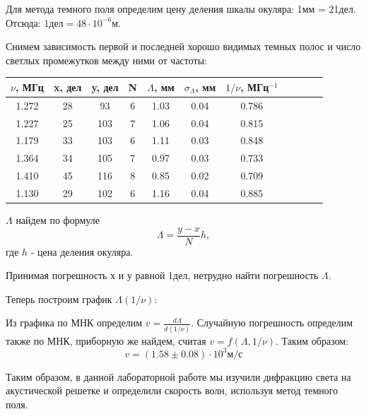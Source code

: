 \documentclass[14pt]{article}
\begin{document}
\vspace{1cm}
Для метода темного поля определим цену деления шкалы окуляра: 1мм = 21дел. Отсюда: $1 \text{дел} = 48\cdot10^{-6}\text{м}$.

Снимем зависимость первой и последней хорошо видимых темных полос и число светлых промежутков между ними от частоты:

\begin{center}
\begin{tabular}{|c|c|c|c|c|c|c|c|c|c|c|}
\hline
$\nu$, МГц	&	x, дел	&	y, дел	&	N	&	$\Lambda$, мм	&	$\sigma_\Lambda$, мм	&	$1/\nu$, МГц$^{-1}$	\\
\hline
1.272		&	28		&	93		&	6	&	1.03			&	0.04					&	0.786				\\
\hline
1.227		&	25		&	103		&	7	&	1.06			&	0.04					&	0.815				\\
\hline
1.179		&	33		&	103		&	6	&	1.11			&	0.03					&	0.848				\\
\hline
1.364		&	34		&	105		&	7	&	0.97			&	0.03					&	0.733				\\
\hline
1.410		&	45		&	116		&	8	&	0.85			&	0.02					&	0.709				\\
\hline
1.130		&	29		&	102		&	6	&	1.16			&	0.04					&	0.885				\\
\hline
\end{tabular}
\end{center}

$\Lambda$ найдем по формуле
$$
	\Lambda = \frac{y-x}{N}h,
$$
\noindent где $h$ - цена деления окуляра.

Принимая погрешность х и у равной 1дел, нетрудно найти погрешность $\Lambda$.

Теперь построим график $\Lambda(1/\nu)$:



Из графика по МНК определим $v = \frac{d\Lambda}{d(1/\nu)}$. Случайную погрешность определим также по МНК, приборную же найдем, считая $v = f(\Lambda, 1/\nu)$. Таким образом:
$$
	v = (1.58 \pm 0.08)\cdot10^3\text{м/с}
$$

\newpage
Таким образом, в данной лабораторной работе мы изучили дифракцию света на акустической решетке и определили скорость волн, используя метод темного поля.
\end{document}
